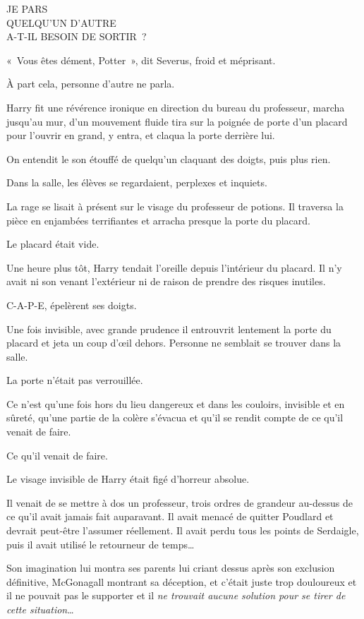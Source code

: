 \medskip
\begin{writtenNote}%
JE PARS\\
QUELQU'UN D'AUTRE\\
A-T-IL BESOIN DE SORTIR~?
\end{writtenNote}%

«~Vous êtes dément, Potter~», dit Severus, froid et méprisant.

À part cela, personne d'autre ne parla.

Harry fit une révérence ironique en direction du bureau du professeur, marcha jusqu'au mur, d'un mouvement fluide tira sur la poignée de porte d'un placard pour l'ouvrir en grand, y entra, et claqua la porte derrière lui.

On entendit le son étouffé de quelqu'un claquant des doigts, puis plus rien.

Dans la salle, les élèves se regardaient, perplexes et inquiets.

La rage se lisait à présent sur le visage du professeur de potions.
Il traversa la pièce en enjambées terrifiantes et arracha presque la porte du placard.

Le placard était vide.

\later

Une heure plus tôt, Harry tendait l'oreille depuis l'intérieur du placard.
Il n'y avait ni son venant l'extérieur ni de raison de prendre des risques inutiles.

C-A-P-E, épelèrent ses doigts.

Une fois invisible, avec grande prudence il entrouvrit lentement la porte du placard et jeta un coup d'œil dehors.
Personne ne semblait se trouver dans la salle.

La porte n'était pas verrouillée.

Ce n'est qu'une fois hors du lieu dangereux et dans les couloirs, invisible et en sûreté, qu'une partie de la colère s'évacua et qu'il se rendit compte de ce qu'il venait de faire.

Ce qu'il venait de faire.

Le visage invisible de Harry était figé d'horreur absolue.

Il venait de se mettre à dos un professeur, trois ordres de grandeur au-dessus de ce qu'il avait jamais fait auparavant.
Il avait menacé de quitter Poudlard et devrait peut-être l'assumer réellement.
Il avait perdu tous les points de Serdaigle, puis il avait utilisé le retourneur de temps…

Son imagination lui montra ses parents lui criant dessus après son exclusion définitive, McGonagall montrant sa déception, et c'était juste trop douloureux et il ne pouvait pas le supporter et il \emph{ne trouvait aucune solution pour se tirer de cette situation}…

